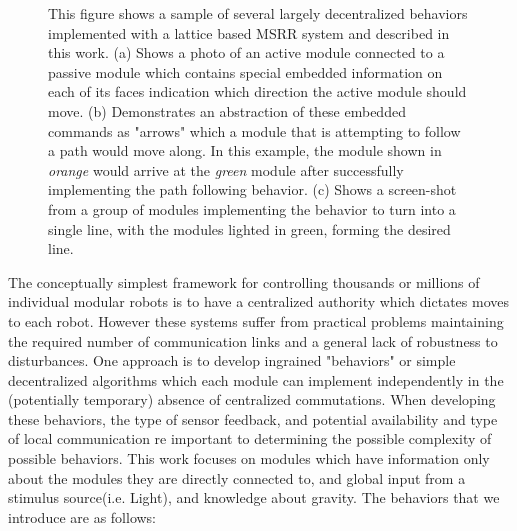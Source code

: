 \begin{figure}[t]
	
	\caption{This figure shows a sample of several largely decentralized behaviors implemented with a lattice based MSRR system and described in this work. (a) Shows a photo of an active module connected to a passive module which contains special embedded information on each of its faces indication which direction the active module should move. (b) Demonstrates an abstraction of these embedded commands as "arrows" which a module that is attempting to follow a path would move along. In this example, the module shown in \emph{orange} would arrive at the \emph{green} module after successfully implementing the path following behavior. (c) Shows a screen-shot from a group of modules implementing the behavior to turn into a single line, with the modules lighted in green, forming the desired line.}
	
	\label{fig:intro}
\end{figure}

The conceptually simplest framework for controlling thousands or millions of individual modular robots is to have a centralized authority which dictates moves to each robot. However these systems suffer from practical problems maintaining the required number of communication links and a general lack of robustness to disturbances. One approach is to develop ingrained "behaviors" or simple decentralized algorithms which each module can implement independently in the (potentially temporary) absence of centralized commutations. When developing these behaviors, the type of sensor feedback, and potential availability and type of local communication re important to determining the possible complexity of possible behaviors. This work focuses on modules which have information only about the modules they are directly connected to, and global input from a stimulus source(i.e. Light), and knowledge about gravity. The behaviors that we introduce are as follows:

